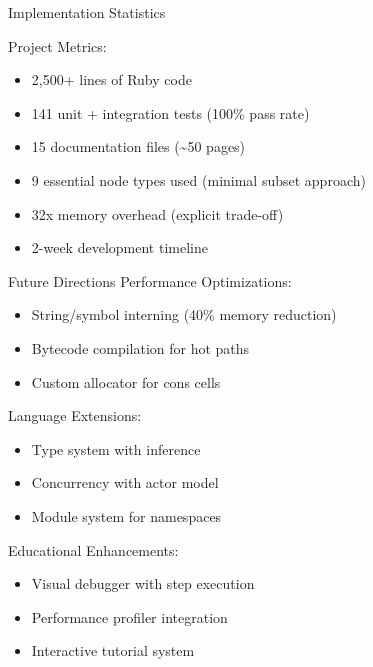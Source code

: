 \documentclass[presentation,aspectratio=169]{beamer}
\begin{document}
\begin{frame}[label={sec:orge2c90ca}]{Implementation Statistics}
\begin{center}
\alert{Project Metrics}:
\begin{itemize}
\item 2,500+ lines of Ruby code
\item 141 unit + integration tests (100\% pass rate)
\item 15 documentation files (\textasciitilde{}50 pages)
\item 9 essential node types used (minimal subset approach)
\item 32x memory overhead (explicit trade-off)
\item 2-week development timeline
\end{itemize}
\end{center}
\end{frame}
\begin{frame}[label={sec:orgf519866}]{Future Directions}
\alert{Performance Optimizations}:
\begin{itemize}
\item String/symbol interning (40\% memory reduction)
\item Bytecode compilation for hot paths
\item Custom allocator for cons cells
\end{itemize}

\alert{Language Extensions}:
\begin{itemize}
\item Type system with inference
\item Concurrency with actor model
\item Module system for namespaces
\end{itemize}

\alert{Educational Enhancements}:
\begin{itemize}
\item Visual debugger with step execution
\item Performance profiler integration
\item Interactive tutorial system
\end{itemize}
\end{frame}
\end{document}
